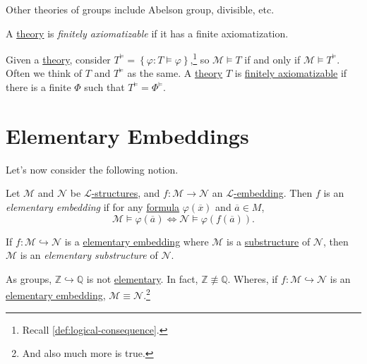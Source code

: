 Other theories of groups include Abelson group, divisible, etc.

\begin{definition}\label{def:finitely-axiomatizable}
	A \hyperref[def:theory]{theory} is \emph{finitely axiomatizable} if it has a finite axiomatization.
\end{definition}

Given a \hyperref[def:theory]{theory}, consider \(T^{\models } = \left\{ \varphi \colon T \models \varphi \right\}\),\footnote{Recall \autoref{def:logical-consequence}.} so \(\mathcal{M} \models T\) if and only if \(\mathcal{M} \models T^{\models }\). Often we think of \(T\) and \(T^{\models }\) as the same. A \hyperref[def:theory]{theory} \(T\) is \hyperref[def:finitely-axiomatizable]{finitely axiomatizable} if there is a finite \(\Phi \) such that \(T^{\models } = \Phi ^{\models }\).

\section{Elementary Embeddings}
Let's now consider the following notion.

\begin{definition}\label{def:elementary-embedding}
	Let \(\mathcal{M} \) and \(\mathcal{N} \) be \hyperref[def:structure]{\(\mathcal{L} \)-structures}, and \(f\colon \mathcal{M} \to \mathcal{N} \) an \hyperref[def:embedding]{\(\mathcal{L} \)-embedding}. Then \(f\) is an \emph{elementary embedding} if for any \hyperref[def:formula]{formula} \(\varphi (\overline{x} )\) and \(\overline{a} \in M\),
	\[
		\mathcal{M} \models \varphi (\overline{a} )\iff \mathcal{N} \models \varphi (f(\overline{a} )).
	\]
\end{definition}

\begin{definition}\label{def:elementary-substructure}
	If \(f\colon \mathcal{M} \hookrightarrow \mathcal{N} \) is a \hyperref[def:elementary-embedding]{elementary embedding} where \(\mathcal{M}\) is a \hyperref[def:substructure]{substructure} of \(\mathcal{N} \), then \(\mathcal{M} \) is an \emph{elementary substructure} of \(\mathcal{N} \).
\end{definition}

\begin{eg}
	As groups, \(\mathbb{Z} \hookrightarrow \mathbb{Q} \) is not \hyperref[def:elementary-embedding]{elementary}. In fact, \(\mathbb{Z} \not\equiv \mathbb{Q} \). Wheres, if \(f\colon \mathcal{M} \hookrightarrow \mathcal{N} \) is an \hyperref[def:elementary-embedding]{elementary embedding}, \(\mathcal{M} \equiv \mathcal{N} \).\footnote{And also much more is true.}
\end{eg}

